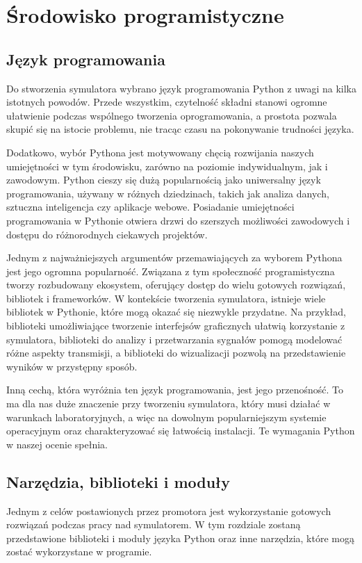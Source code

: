 \section{Środowisko programistyczne}
\subsection{Język programowania}

Do stworzenia symulatora wybrano język programowania Python z uwagi na kilka istotnych powodów. Przede wszystkim, czytelność składni stanowi ogromne ułatwienie podczas wspólnego tworzenia oprogramowania, a prostota pozwala skupić się na istocie problemu, nie tracąc czasu na pokonywanie trudności języka.

Dodatkowo, wybór Pythona jest motywowany chęcią rozwijania naszych umiejętności w tym środowisku, zarówno na poziomie indywidualnym, jak i zawodowym. Python cieszy się dużą popularnością jako uniwersalny język programowania, używany w różnych dziedzinach, takich jak analiza danych, sztuczna inteligencja czy aplikacje webowe. Posiadanie umiejętności programowania w Pythonie otwiera drzwi do szerszych możliwości zawodowych i dostępu do różnorodnych ciekawych projektów.

Jednym z najważniejszych argumentów przemawiających za wyborem Pythona jest jego ogromna popularność. Związana z tym społeczność programistyczna tworzy rozbudowany ekosystem, oferujący dostęp do wielu gotowych rozwiązań, bibliotek i frameworków. W kontekście tworzenia symulatora, istnieje wiele bibliotek w Pythonie, które mogą okazać się niezwykle przydatne. Na przykład, biblioteki umożliwiające tworzenie interfejsów graficznych ułatwią korzystanie z symulatora, biblioteki do analizy i przetwarzania sygnałów pomogą modelować różne aspekty transmisji, a biblioteki do wizualizacji pozwolą na przedstawienie wyników w przystępny sposób.

Inną cechą, która wyróżnia ten język programowania, jest jego przenośność. To ma dla nas duże znaczenie przy tworzeniu symulatora, który musi działać w warunkach laboratoryjnych, a więc na dowolnym popularniejszym systemie operacyjnym oraz charakteryzować się łatwością instalacji. Te wymagania Python w naszej ocenie spełnia.

\subsection{Narzędzia, biblioteki i moduły}
Jednym z celów postawionych przez promotora jest wykorzystanie gotowych rozwiązań podczas pracy nad symulatorem. W tym rozdziale zostaną przedstawione biblioteki i moduły języka Python oraz inne narzędzia, które mogą zostać wykorzystane w programie.

